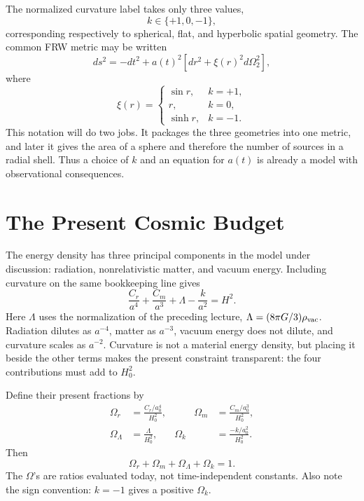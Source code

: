 The normalized curvature label takes only three values,
\begin{equation}
k\in\{+1,0,-1\},
\end{equation}
corresponding respectively to spherical, flat, and hyperbolic spatial geometry. The common FRW metric may be written
\begin{equation}
ds^2=-dt^2+a(t)^2\left[dr^2+\xi(r)^2d\Omega_2^2\right],
\label{eq:c06-frw}
\end{equation}
where
\begin{equation}
\xi(r)=
\begin{cases}
\sin r, & k=+1,\\
r, & k=0,\\
\sinh r, & k=-1.
\end{cases}
\label{eq:c06-xi}
\end{equation}
This notation will do two jobs. It packages the three geometries into one metric, and later it gives the area of a sphere and therefore the number of sources in a radial shell. Thus a choice of \(k\) and an equation for \(a(t)\) is already a model with observational consequences.

\section{The Present Cosmic Budget}

The energy density has three principal components in the model under discussion: radiation, nonrelativistic matter, and vacuum energy. Including curvature on the same bookkeeping line gives
\begin{equation}
\frac{C_r}{a^4}
+\frac{C_m}{a^3}
+\Lambda
-\frac{k}{a^2}
=H^2.
\label{eq:c06-budget}
\end{equation}
Here \(\Lambda\) uses the normalization of the preceding lecture, \(\Lambda=(8\pi G/3)\rho_{\rm vac}\). Radiation dilutes as \(a^{-4}\), matter as \(a^{-3}\), vacuum energy does not dilute, and curvature scales as \(a^{-2}\). Curvature is not a material energy density, but placing it beside the other terms makes the present constraint transparent: the four contributions must add to \(H_0^2\).

Define their present fractions by
\begin{equation}
\begin{aligned}
\Omega_r&=\frac{C_r/a_0^4}{H_0^2},
&\qquad
\Omega_m&=\frac{C_m/a_0^3}{H_0^2},\\
\Omega_\Lambda&=\frac{\Lambda}{H_0^2},
&
\Omega_k&=\frac{-k/a_0^2}{H_0^2}.
\end{aligned}
\label{eq:c06-omegas}
\end{equation}
Then
\begin{equation}
\boxed{\Omega_r+\Omega_m+\Omega_\Lambda+\Omega_k=1.}
\label{eq:c06-sum-rule}
\end{equation}
The \(\Omega\)'s are ratios evaluated today, not time-independent constants. Also note the sign convention: \(k=-1\) gives a positive \(\Omega_k\).


